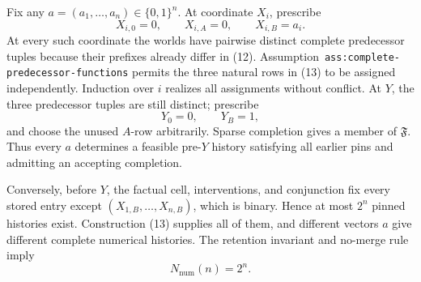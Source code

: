 Fix any \(a=(a_1,\ldots,a_n)\in\{0,1\}^n\). At coordinate \(X_i\), prescribe
\[
 X_{i,0}=0,
 \qquad
 X_{i,A}=0,
 \qquad
 X_{i,B}=a_i.
 \tag{13}
\]
At every such coordinate the worlds have pairwise distinct complete predecessor tuples because their prefixes already differ in (12). Assumption~\texttt{ass:complete-predecessor-functions} permits the three natural rows in (13) to be assigned independently. Induction over \(i\) realizes all assignments without conflict. At \(Y\), the three predecessor tuples are still distinct; prescribe
\[
 Y_0=0,
 \qquad
 Y_B=1,
\]
and choose the unused \(A\)-row arbitrarily. Sparse completion gives a member of \(\mathfrak F\). Thus every \(a\) determines a feasible pre-\(Y\) history satisfying all earlier pins and admitting an accepting completion.

Conversely, before \(Y\), the factual cell, interventions, and conjunction fix every stored entry except \((X_{1,B},\ldots,X_{n,B})\), which is binary. Hence at most \(2^n\) pinned histories exist. Construction (13) supplies all of them, and different vectors \(a\) give different complete numerical histories. The retention invariant and no-merge rule imply
\[
 N_{\mathrm{num}}(n)=2^n.
\]

